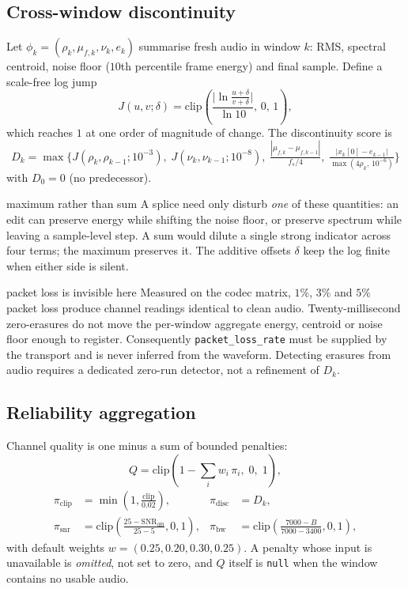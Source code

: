 \documentclass[11pt,a4paper]{article}
\newcommand{\code}[1]{\texttt{\small #1}}
\begin{document}
\subsection{Cross-window discontinuity}

Let $\phi_k = (\rho_k, \mu_{f,k}, \nu_k, e_k)$ summarise fresh audio in window $k$:
RMS, spectral centroid, noise floor ($10$th percentile frame energy) and final sample.
Define a scale-free log jump
\begin{equation}
J(u,v;\delta) = \mathrm{clip}\!\left(\frac{\big|\ln\frac{u+\delta}{v+\delta}\big|}{\ln 10},\,0,\,1\right),
\end{equation}
which reaches $1$ at one order of magnitude of change. The discontinuity score is
\begin{equation}
D_k = \max\Big\{
J(\rho_k,\rho_{k-1};10^{-3}),\;
J(\nu_k,\nu_{k-1};10^{-8}),\;
\tfrac{|\mu_{f,k}-\mu_{f,k-1}|}{f_s/4},\;
\tfrac{|x_k[0]-e_{k-1}|}{\max(4\rho_k,\,10^{-6})}
\Big\}
\end{equation}
with $D_0 = 0$ (no predecessor).

\begin{whybox}{maximum rather than sum}
A splice need only disturb \emph{one} of these quantities: an edit can preserve energy
while shifting the noise floor, or preserve spectrum while leaving a sample-level step.
A sum would dilute a single strong indicator across four terms; the maximum preserves
it. The additive offsets $\delta$ keep the log finite when either side is silent.
\end{whybox}

\begin{warnbox}{packet loss is invisible here}
Measured on the codec matrix, $1\%$, $3\%$ and $5\%$ packet loss produce channel
readings identical to clean audio. Twenty-millisecond zero-erasures do not move the
per-window aggregate energy, centroid or noise floor enough to register. Consequently
\code{packet\_loss\_rate} must be supplied by the transport and is never inferred from
the waveform. Detecting erasures from audio requires a dedicated zero-run detector, not
a refinement of $D_k$.
\end{warnbox}

\subsection{Reliability aggregation}

Channel quality is one minus a sum of bounded penalties:
\begin{equation}
Q = \mathrm{clip}\!\left(1 - \sum_{i} w_i \,\pi_i,\; 0,\; 1\right),
\end{equation}
\begin{align}
\pi_{\mathrm{clip}} &= \min\!\left(1, \tfrac{\mathrm{clip}}{0.02}\right), &
\pi_{\mathrm{disc}} &= D_k, \\
\pi_{\mathrm{snr}} &= \mathrm{clip}\!\left(\tfrac{25 - \mathrm{SNR_{dB}}}{25-5},0,1\right), &
\pi_{\mathrm{bw}} &= \mathrm{clip}\!\left(\tfrac{7000 - B}{7000-3400},0,1\right),
\end{align}
with default weights $w = (0.25, 0.20, 0.30, 0.25)$. A penalty whose input is
unavailable is \emph{omitted}, not set to zero, and $Q$ itself is \code{null} when the
window contains no usable audio.
\end{document}
